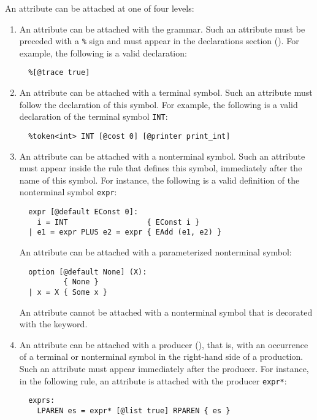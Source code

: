 \documentclass[onecolumn,11pt,nocopyrightspace,preprint]{sigplanconf}
\begin{document}
An attribute can be attached at one of four levels:
\begin{enumerate}

\item An attribute can be attached with the grammar.
  Such an attribute must be preceded with a \verb+%+ sign and must appear
  in the declarations section (). For example, the following
  is a valid declaration:
\begin{verbatim}
  %[@trace true]
\end{verbatim}

\item An attribute can be attached with a terminal symbol.
  Such an attribute must follow the declaration of this symbol.
  For example, the following is a valid declaration of the terminal symbol \verb+INT+:
\begin{verbatim}
  %token<int> INT [@cost 0] [@printer print_int]
\end{verbatim}

\item An attribute can be attached with a nonterminal symbol.
  Such an attribute must appear inside the rule that defines this symbol,
  immediately after the name of this symbol. For instance, the following is a valid
  definition of the nonterminal symbol \verb+expr+:
\begin{verbatim}
  expr [@default EConst 0]:
    i = INT                  { EConst i }
  | e1 = expr PLUS e2 = expr { EAdd (e1, e2) }
\end{verbatim}
  An attribute can be attached with a parameterized nonterminal symbol:
\begin{verbatim}
  option [@default None] (X):
          { None }
  | x = X { Some x }
\end{verbatim}
  An attribute cannot be attached with a nonterminal symbol that is
  decorated with the \dinline keyword.

\item An attribute can be attached with a producer (),
  that is, with an occurrence of a terminal or nonterminal symbol in the
  right-hand side of a production. Such an attribute must appear immediately
  after the producer. For instance, in the following rule,
  an attribute is attached with the producer \verb+expr*+:
\begin{verbatim}
  exprs:
    LPAREN es = expr* [@list true] RPAREN { es }
\end{verbatim}

\end{enumerate}
\end{document}

